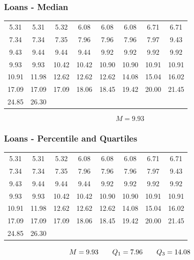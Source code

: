 \documentclass{beamer}
\begin{document}
\begin{frame}
  \frametitle{Loans - Median}
  \begin{table}
    \begin{tabular}{@{}cccccccc@{}}
      \toprule
      5.31 & 5.31 & 5.32 & 6.08 & 6.08 & 6.08 & 6.71 & 6.71 
      \\[0.3em]
      7.34 & 7.34 & 7.35 & 7.96 & 7.96 & 7.96 & 7.97 & 9.43 
      \\[0.3em]
      9.43 & 9.44 & 9.44 & 9.44 & 9.92 & 9.92 & 9.92 & 9.92 
      \\[0.3em]
      9.93 & 9.93 & 10.42 & 10.42 & 10.90 & 10.90 & 10.91 & 10.91 
      \\[0.3em]
      10.91 & 11.98 & 12.62 & 12.62 & 12.62 & 14.08 & 15.04 & 16.02
      \\[0.3em]
      17.09 & 17.09 & 17.09 & 18.06 & 18.45 & 19.42 & 20.00 & 21.45
      \\[0.3em]
      24.85 & 26.30 \\
      \bottomrule 
    \end{tabular}
  \end{table}
  \begin{equation*}
    M = 9.93 
  \end{equation*}
\end{frame}

\begin{frame}
  \frametitle{Loans - Percentile and Quartiles}
  \begin{table}
    \begin{tabular}{@{}cccccccc@{}}
      \toprule
      5.31 & 5.31 & 5.32 & 6.08 & 6.08 & 6.08 & 6.71 & 6.71 
      \\[0.3em]
      7.34 & 7.34 & 7.35 & 7.96 & 7.96 & 7.96 & 7.97 & 9.43 
      \\[0.3em]
      9.43 & 9.44 & 9.44 & 9.44 & 9.92 & 9.92 & 9.92 & 9.92 
      \\[0.3em]
      9.93 & 9.93 & 10.42 & 10.42 & 10.90 & 10.90 & 10.91 & 10.91 
      \\[0.3em]
      10.91 & 11.98 & 12.62 & 12.62 & 12.62 & 14.08 & 15.04 & 16.02
      \\[0.3em]
      17.09 & 17.09 & 17.09 & 18.06 & 18.45 & 19.42 & 20.00 & 21.45
      \\[0.3em]
      24.85 & 26.30 \\
      \bottomrule 
    \end{tabular}
  \end{table}
  \begin{equation*}
    M = 9.93 \hspace{0.7cm}
    Q_1 = 7.96 \hspace{0.7cm}
    Q_3 = 14.08 
  \end{equation*}
\end{frame}
\end{document}
